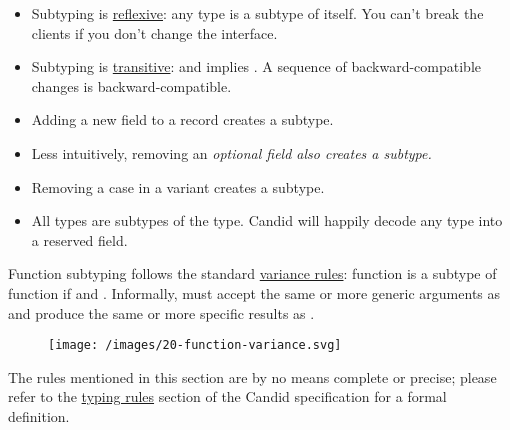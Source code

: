 \documentclass{article}
\begin{document}
\begin{itemize}
    \item
    Subtyping is \href{https://en.wikipedia.org/wiki/Reflexive_relation}{reflexive}: any type is a subtype of itself.
    You can't break the clients if you don't change the interface.
    \item
    Subtyping is \href{https://en.wikipedia.org/wiki/Transitive_relation}{transitive}:  and  implies .
    A sequence of backward-compatible changes is backward-compatible.
    \item
    Adding a new field to a record creates a subtype.\newline
    \item
    Less intuitively, removing an \em{optional} field also creates a subtype.
    \newline
    \item
    Removing a case in a variant creates a subtype.\newline
    \item
    All types are subtypes of the  type.
    Candid will happily decode any type into a reserved field.
\end{itemize}

Function subtyping follows the standard \href{https://en.wikipedia.org/wiki/Covariance_and_contravariance_(computer_science)#Function_types}{variance rules}:
function  is a subtype of function  if  and .
Informally,  must accept the same or more generic arguments as  and produce the same or more specific results as .

\begin{figure}[grayscale-diagram]
\texttt{[image: /images/20-function-variance.svg]}
\end{figure}

The rules mentioned in this section are by no means complete or precise; please refer to the \href{https://github.com/dfinity/candid/blob/master/spec/Candid.md#rules}{typing rules} section of the Candid specification for a formal definition.
\end{document}
